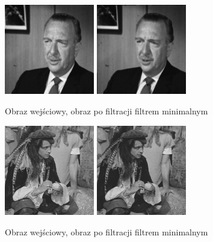 \documentclass[final,a4paper,openany,12pt]{mwbk}
\begin{document}
\begin{figure}[H]
	\begin{center}
		\includegraphics[width=0.35\textwidth]{gentelman_gray}
		\includegraphics[width=0.35\textwidth]{gentelman_gray_min_result}
	\end{center}
	\caption{Obraz wejściowy, obraz po filtracji filtrem minimalnym}
\end{figure}

\begin{figure}[H]
	\begin{center}
		\includegraphics[width=0.35\textwidth]{pirate_gray}
		\includegraphics[width=0.35\textwidth]{pirate_gray_min_result}
	\end{center}
	\caption{Obraz wejściowy, obraz po filtracji filtrem minimalnym}
\end{figure}
\end{document}
